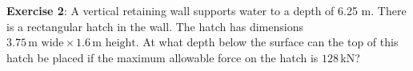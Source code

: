 \documentclass[10pt,onesided]{amsart}
\begin{document}
\begin{minipage}[t]{0.35\textwidth}
	\raggedright
	\textbf{Exercise 2}:
	\parb
	A vertical retaining wall supports water to a depth of 6.25 m. There
	is a rectangular hatch in the wall. The hatch has dimensions $3.75\,\text{m wide}\times 1.6\,\text{m height}$.
	\parb
	At what depth below the surface can the top of this hatch be placed if the maximum allowable force on the hatch is $128\,$kN?
\end{minipage}
\newpage
\end{document}

